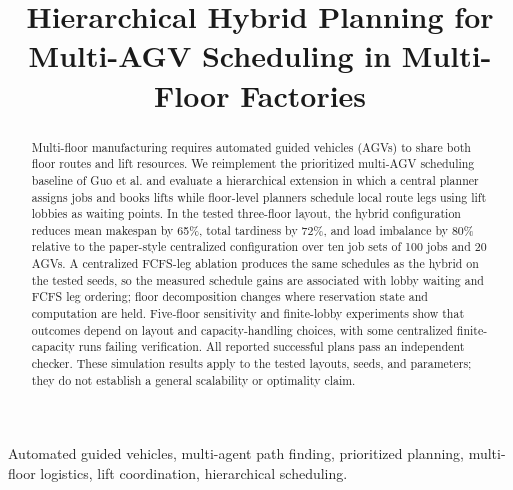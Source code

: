 \documentclass[conference]{IEEEtran}
\title{Hierarchical Hybrid Planning for Multi-AGV Scheduling in Multi-Floor Factories}
\author{\IEEEauthorblockN{Author Name(s)}
\IEEEauthorblockA{Department or Organization\\
City, Country\\
email address}}
\begin{document}
\maketitle

\begin{abstract}
Multi-floor manufacturing requires automated guided vehicles (AGVs) to share
both floor routes and lift resources. We reimplement the prioritized
multi-AGV scheduling baseline of Guo et al. and evaluate a hierarchical
extension in which a central planner assigns jobs and books lifts while
floor-level planners schedule local route legs using lift lobbies as waiting
points. In the tested three-floor layout, the hybrid configuration reduces
mean makespan by 65\%, total tardiness by 72\%, and load imbalance by 80\%
relative to the paper-style centralized configuration over ten job sets of
100 jobs and 20 AGVs. A centralized FCFS-leg ablation produces the same
schedules as the hybrid on the tested seeds, so the measured schedule gains
are associated with lobby waiting and FCFS leg ordering; floor decomposition
changes where reservation state and computation are held. Five-floor
sensitivity and finite-lobby experiments show that outcomes depend on layout
and capacity-handling choices, with some centralized finite-capacity runs
failing verification. All reported successful plans pass an independent
checker. These simulation results apply to the tested layouts, seeds, and
parameters; they do not establish a general scalability or optimality claim.
\end{abstract}

\begin{IEEEkeywords}
Automated guided vehicles, multi-agent path finding, prioritized planning,
multi-floor logistics, lift coordination, hierarchical scheduling.
\end{IEEEkeywords}











\appendices




\end{document}
